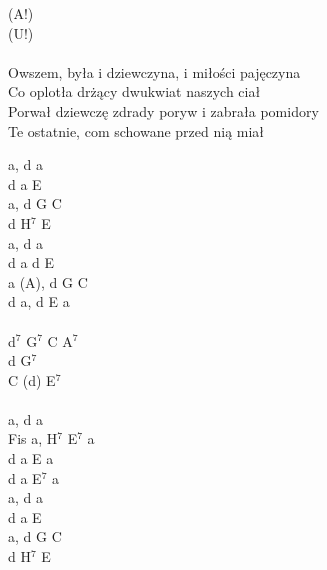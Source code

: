 \documentclass[a5paper, 10pt]{book}
\begin{document}
\begin{minipage}[t]{0.8\textwidth}
  \hspace*{5mm}(A!) \\
  \hspace*{5mm}(U!) \\
  \\
  Owszem, była i dziewczyna, i miłości pajęczyna\\
  Co oplotła drżący dwukwiat naszych ciał\\
  Porwał dziewczę zdrady poryw i zabrała pomidory\\
  Te ostatnie, com schowane przed nią miał\\
\end{minipage}
\begin{minipage}[t]{0.2\textwidth}
  a, d a\\
  d a E\\
  a, d G C\\
  d H$^7$ E\\

  a, d a\\
  d a d E\\
  a (A), d G C\\
  d a, d E a\\
  \\
  d$^7$ G$^7$ C A$^7$\\
  d G$^7$\\
  C (d) E$^7$\\
  \\
  a, d a\\
  Fis a, H$^7$ E$^7$ a\\
  d a E a\\
  d a E$^7$ a\\

  a, d a\\
  d a E\\
  a, d G C\\
  d H$^7$ E\\
\end{minipage}

\newpage
\end{document}
